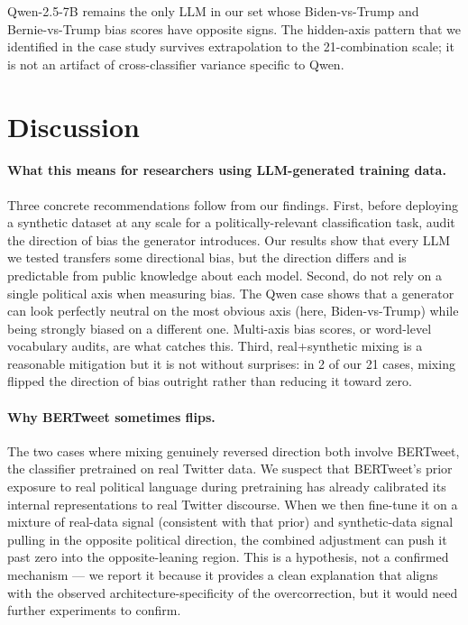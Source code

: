 \documentclass[11pt]{article}
\begin{document}
Qwen-2.5-7B remains the only LLM in our set whose Biden-vs-Trump and Bernie-vs-Trump bias scores have opposite signs. The hidden-axis pattern that we identified in the case study survives extrapolation to the 21-combination scale; it is not an artifact of cross-classifier variance specific to Qwen.

\section{Discussion}
\label{sec:discussion}

\paragraph{What this means for researchers using LLM-generated training data.}
Three concrete recommendations follow from our findings. First, before deploying a synthetic dataset at any scale for a politically-relevant classification task, audit the direction of bias the generator introduces. Our results show that every LLM we tested transfers some directional bias, but the direction differs and is predictable from public knowledge about each model. Second, do not rely on a single political axis when measuring bias. The Qwen case shows that a generator can look perfectly neutral on the most obvious axis (here, Biden-vs-Trump) while being strongly biased on a different one. Multi-axis bias scores, or word-level vocabulary audits, are what catches this. Third, real+synthetic mixing is a reasonable mitigation but it is not without surprises: in 2 of our 21 cases, mixing flipped the direction of bias outright rather than reducing it toward zero.

\paragraph{Why BERTweet sometimes flips.}
The two cases where mixing genuinely reversed direction both involve BERTweet, the classifier pretrained on real Twitter data. We suspect that BERTweet's prior exposure to real political language during pretraining has already calibrated its internal representations to real Twitter discourse. When we then fine-tune it on a mixture of real-data signal (consistent with that prior) and synthetic-data signal pulling in the opposite political direction, the combined adjustment can push it past zero into the opposite-leaning region. This is a hypothesis, not a confirmed mechanism --- we report it because it provides a clean explanation that aligns with the observed architecture-specificity of the overcorrection, but it would need further experiments to confirm.
\end{document}
